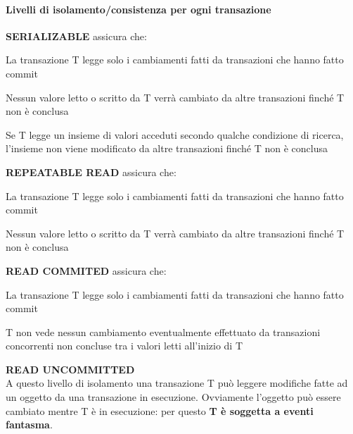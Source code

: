 \documentclass[10pt]{book}
\begin{document}
\paragraph{Livelli di isolamento/consistenza per ogni transazione}
\begin{list}{}{}
	\item \textbf{SERIALIZABLE} assicura che:
	\begin{list}{}{}
		\item La transazione T legge solo i cambiamenti fatti da transazioni che hanno fatto commit
		\item Nessun valore letto o scritto da T verrà cambiato da altre transazioni finché T non è conclusa
		\item Se T legge un insieme di valori acceduti secondo qualche condizione di ricerca, l'insieme non viene modificato da altre transazioni finché T non è conclusa
	\end{list}
	\item \textbf{REPEATABLE READ} assicura che:
	\begin{list}{}{}
		\item La transazione T legge solo i cambiamenti fatti da transazioni che hanno fatto commit
		\item Nessun valore letto o scritto da T verrà cambiato da altre transazioni finché T non è conclusa
	\end{list}
	\item \textbf{READ COMMITED} assicura che:
	\begin{list}{}{}
		\item La transazione T legge solo i cambiamenti fatti da transazioni che hanno fatto commit
		\item T non vede nessun cambiamento eventualmente effettuato da transazioni concorrenti non concluse tra i valori letti all'inizio di T
	\end{list}
	\item \textbf{READ UNCOMMITTED}\\
	A questo livello di isolamento una transazione T può leggere modifiche fatte ad un oggetto da una transazione in esecuzione. Ovviamente l'oggetto può essere cambiato mentre T è in esecuzione: per questo \textbf{T è soggetta a eventi fantasma}.
\end{list}
\end{document}

